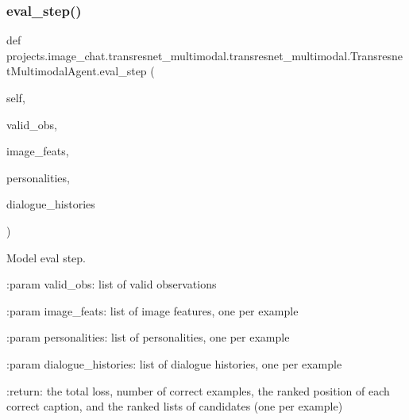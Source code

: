 \mbox{\label{classprojects_1_1image__chat_1_1transresnet__multimodal_1_1transresnet__multimodal_1_1TransresnetMultimodalAgent_a8f934968183ae14794bcec65abaef624}} 
\subsubsection{\texorpdfstring{eval\+\_\+step()}{eval\_step()}}
{\footnotesize\ttfamily def projects.\+image\+\_\+chat.\+transresnet\+\_\+multimodal.\+transresnet\+\_\+multimodal.\+Transresnet\+Multimodal\+Agent.\+eval\+\_\+step (\begin{DoxyParamCaption}\item[{}]{self,  }\item[{}]{valid\+\_\+obs,  }\item[{}]{image\+\_\+feats,  }\item[{}]{personalities,  }\item[{}]{dialogue\+\_\+histories }\end{DoxyParamCaption})}

\begin{DoxyVerb}Model eval step.

:param valid_obs:
    list of valid observations

:param image_feats:
    list of image features, one per example

:param personalities:
    list of personalities, one per example

:param dialogue_histories:
    list of dialogue histories, one per example

:return:
    the total loss, number of correct examples,
    the ranked position of each correct caption,
    and the ranked lists of candidates (one per example)
\end{DoxyVerb}
 

